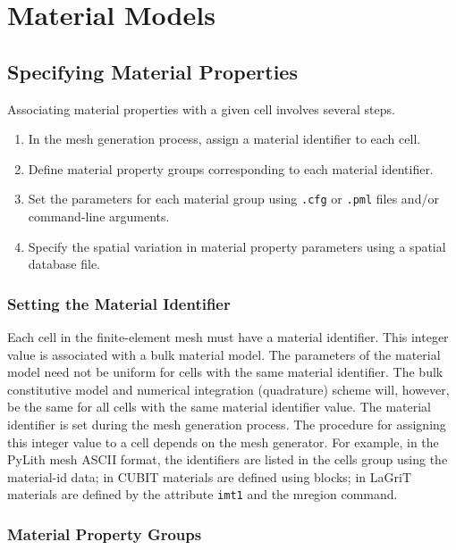 
\chapter{Material Models}
\label{cha:material:models}


\section{Specifying Material Properties}

Associating material properties with a given cell involves several
steps. 
\begin{enumerate}
\item In the mesh generation process, assign a material identifier to each
cell.
\item Define material property groups corresponding to each material identifier.
\item Set the parameters for each material group using \texttt{.cfg} or
\texttt{.pml} files and/or command-line arguments.
\item Specify the spatial variation in material property parameters using
a spatial database file.
\end{enumerate}

\subsection{Setting the Material Identifier}

Each cell in the finite-element mesh must have a material identifier.
This integer value is associated with a bulk material model. The parameters
of the material model need not be uniform for cells with the same
material identifier. The bulk constitutive model and numerical integration
(quadrature) scheme will, however, be the same for all cells with
the same material identifier value. The material identifier is set
during the mesh generation process. The procedure for assigning this
integer value to a cell depends on the mesh generator. For example,
in the PyLith mesh ASCII format, the identifiers are listed in the
cells group using the material-id data; in CUBIT materials are defined
using blocks; in LaGriT materials are defined by the attribute \texttt{imt1}
and the mregion command.


\subsection{Material Property Groups}

